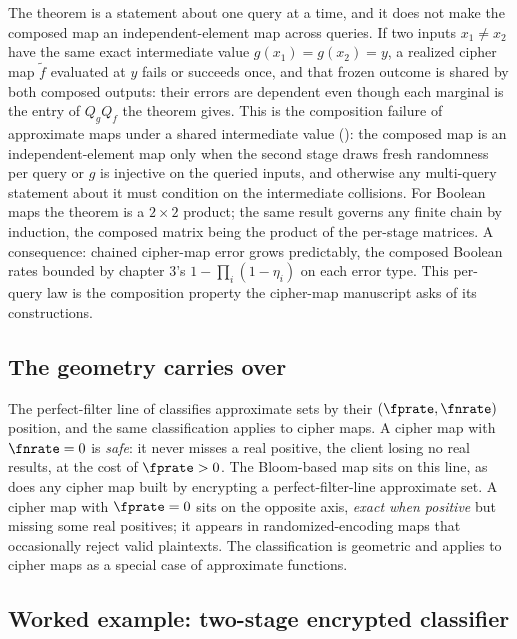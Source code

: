 The theorem is a statement about one query at a time, and it does not
make the composed map an independent-element map across queries. If two
inputs $x_1 \ne x_2$ have the same exact intermediate value $g(x_1) =
g(x_2) = y$, a realized cipher map $\tilde f$ evaluated at $y$ fails or
succeeds once, and that frozen outcome is shared by both composed
outputs: their errors are dependent even though each marginal is the
entry of $Q_g Q_f$ the theorem gives. This is the composition failure of
approximate maps under a shared intermediate value
(): the composed map is an
independent-element map only when the second stage draws fresh randomness
per query or $g$ is injective on the queried inputs, and otherwise any
multi-query statement about it must condition on the intermediate
collisions. For Boolean maps the
theorem is a $2 \times 2$ product; the same result governs any finite
chain by induction, the composed matrix being the product of the
per-stage matrices. A consequence: chained cipher-map error grows
predictably, the composed Boolean rates bounded by chapter 3's
$1 - \prod_i (1 - \eta_i)$ on each error type. This per-query law is the composition property the cipher-map
manuscript \parencite{towell-cipher-maps} asks of its constructions.

\subsection*{The geometry carries over}

The perfect-filter line of  classifies
approximate sets by their $(\fprate, \fnrate)$ position, and the same
classification applies to cipher maps. A cipher map with $\fnrate = 0$ is
\emph{safe}: it never misses a real positive, the client losing no real
results, at the cost of $\fprate > 0$. The Bloom-based map sits on this
line, as does any cipher map built by encrypting a perfect-filter-line
approximate set. A cipher map with $\fprate = 0$ sits on the opposite
axis, \emph{exact when positive} but missing some real positives;
it appears in randomized-encoding maps that occasionally reject valid
plaintexts. The classification is geometric and applies to cipher maps as
a special case of approximate functions.

\subsection*{Worked example: two-stage encrypted classifier}

